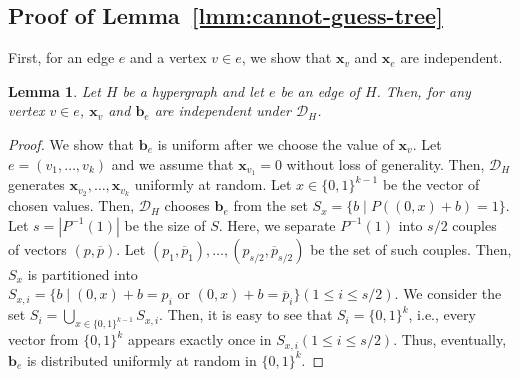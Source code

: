 \documentclass[letterpaper,11pt]{article}
\newtheorem{lemma}[theorem]{Lemma}
\newcommand{\cald}{\mathcal{D}}
\newcommand{\bfx}{\mathbf{x}}
\newcommand{\bfb}{\mathbf{b}}
\newcommand{\bit}{\{0,1\}}
\begin{document}
\subsection{Proof of Lemma~\ref{lmm:cannot-guess-tree}}\label{apx:cannot-guess-tree}
First, for an edge $e$ and a vertex $v\in e$,
we show that $\bfx_v$ and $\bfx_e$ are independent.
\begin{lemma}\label{lmm:cannot-guess-edge}
  Let $H$ be a hypergraph and let $e$ be an edge of $H$.
  Then, for any vertex $v\in e$, $\bfx_v$ and $\bfb_e$ are independent under $\cald_H$.
\end{lemma}
\begin{proof}
  We show that $\bfb_e$ is uniform after we choose the value of $\bfx_v$.
  Let $e=(v_1,\ldots,v_k)$ and we assume that $\bfx_{v_1}=0$ without loss of generality.
  Then, $\cald_H$ generates $\bfx_{v_2},\ldots,\bfx_{v_k}$ uniformly at random.
  Let $x \in \bit^{k-1}$ be the vector of chosen values.
  Then, $\cald_H$ chooses $\bfb_e$ from the set $S_x=\{b\mid P((0,x)+b)=1\}$.
  Let $s=|P^{-1}(1)|$ be the size of $S$.
  Here, we separate $P^{-1}(1)$ into $s/2$ couples of vectors $(p,\overline{p})$.
  Let $(p_1,\overline{p}_1),\ldots,(p_{s/2},\overline{p}_{s/2})$ be the set of such couples.
  Then, $S_x$ is partitioned into $S_{x,i}=\{b\mid(0,x)+b=p_i\mbox{ or }(0,x)+b=\overline{p}_i\} (1\leq i \leq s/2)$.
  We consider the set $S_i=\bigcup_{x\in \bit^{k-1}}S_{x,i}$.
  Then, it is easy to see that $S_i=\bit^k$, i.e., every vector from $\bit^k$ appears exactly once in $S_{x,i} (1\leq i\leq s/2)$.
  Thus, eventually, $\bfb_e$ is distributed uniformly at random in $\bit^k$.
\end{proof}
\end{document}
